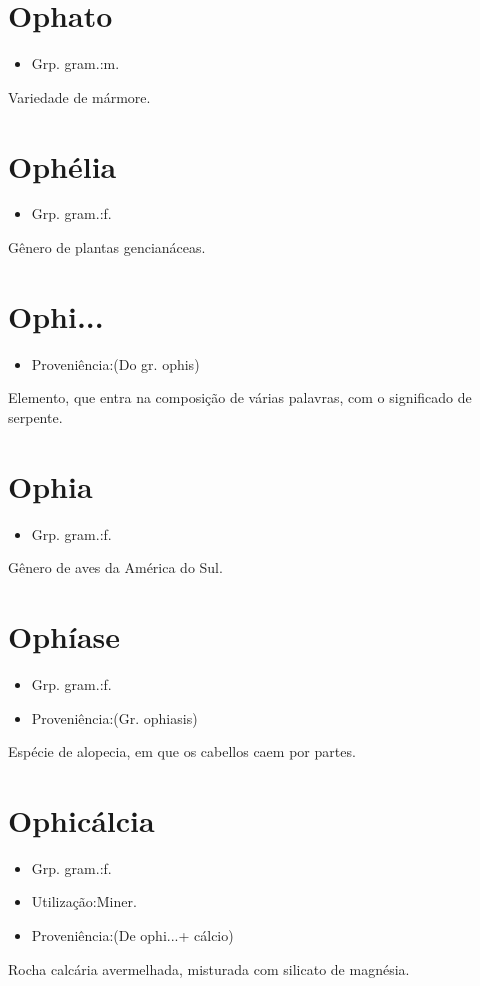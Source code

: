 \section{Ophato}
\begin{itemize}
\item {Grp. gram.:m.}
\end{itemize}
Variedade de mármore.
\section{Ophélia}
\begin{itemize}
\item {Grp. gram.:f.}
\end{itemize}
Gênero de plantas gencianáceas.
\section{Ophi...}
\begin{itemize}
\item {Proveniência:(Do gr. \textunderscore ophis\textunderscore )}
\end{itemize}
Elemento, que entra na composição de várias palavras, com o significado de \textunderscore serpente\textunderscore .
\section{Ophia}
\begin{itemize}
\item {Grp. gram.:f.}
\end{itemize}
Gênero de aves da América do Sul.
\section{Ophíase}
\begin{itemize}
\item {Grp. gram.:f.}
\end{itemize}
\begin{itemize}
\item {Proveniência:(Gr. \textunderscore ophiasis\textunderscore )}
\end{itemize}
Espécie de alopecia, em que os cabellos caem por partes.
\section{Ophicálcia}
\begin{itemize}
\item {Grp. gram.:f.}
\end{itemize}
\begin{itemize}
\item {Utilização:Miner.}
\end{itemize}
\begin{itemize}
\item {Proveniência:(De \textunderscore ophi...\textunderscore  + \textunderscore cálcio\textunderscore )}
\end{itemize}
Rocha calcária avermelhada, misturada com silicato de magnésia.
